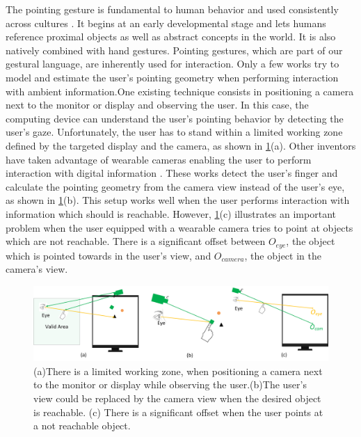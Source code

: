 The pointing gesture is fundamental to human behavior \cite{Matthews2012} and used consistently across cultures \cite{McNeill2000}. It begins at an early developmental stage \cite{Carpendale2010} and lets humans  reference proximal objects as well as abstract concepts in the world. It is also natively combined with hand gestures. Pointing gestures, which are part of our gestural language, are inherently used for interaction\cite{Nanayakkara2013a}. Only a few works try to model and estimate the user{\rq}s pointing geometry when performing interaction with ambient information.One existing technique consists in positioning a camera next to the monitor or display and observing the user. In this case, the computing device can understand the user{\rq}s pointing behavior by detecting the user{\rq}s gaze. Unfortunately, the user has to stand within a limited working zone defined by the targeted display and the camera, as shown in \figurename{ \ref{fig:3-PAST:problem}(a)}.
Other inventors have taken advantage of wearable cameras enabling the user to perform interaction with digital information\cite{Harrison2011} \cite{Mistry2009}.
These works detect the user's finger and calculate the pointing geometry from the camera view instead of the user's eye, as shown in \figurename{ \ref{fig:3-PAST:problem}(b)}. This setup works well when the user performs interaction with information which should is reachable.
However, \figurename{ \ref{fig:3-PAST:problem}(c)} illustrates an important problem when the user equipped with a wearable camera tries to point at objects which are not reachable. There is a significant offset between $O_{eye}$, the object which is pointed towards in the user's view, and $O_{camera}$, the object in the camera's view. 
\begin{figure} [htb]
	\centering
	\includegraphics[width= 1.0\linewidth]{figures/3-PAST/problem.png}
	\caption{(a)There is a limited working zone, when positioning a camera next to the monitor or display while observing the user.(b)The user's view could be replaced by the camera view when the desired object is reachable. (c) There is a significant offset when the user points at a not reachable object.}
	\label{fig:3-PAST:problem}
\end{figure}
